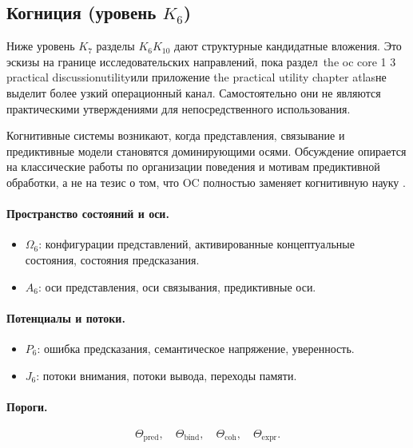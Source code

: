 \subsection{Когниция (уровень \texorpdfstring{$K_6$}{K6})}

Ниже уровень \(K_7\) разделы \(K_6\)\textendash\(K_{10}\) дают
структурные кандидатные вложения.
Это эскизы на границе исследовательских направлений, пока
раздел~the oc core 1 3 practical discussionutilityили приложение
the practical utility chapter atlasне выделит более узкий
операционный канал.
Самостоятельно они не являются практическими утверждениями для непосредственного
использования.

Когнитивные системы возникают, когда представления, связывание и
предиктивные модели становятся доминирующими осями.
Обсуждение опирается на классические работы по организации поведения и
мотивам предиктивной обработки, а не на тезис о том, что OC полностью
заменяет когнитивную науку \parencite{hebb_organization,friston_free_energy}.

\paragraph{Пространство состояний и оси.}
\begin{itemize}
  \item \(\Omega_6\): конфигурации представлений, активированные
        концептуальные состояния, состояния предсказания.
  \item \(A_6\): оси представления, оси связывания, предиктивные оси.
\end{itemize}

\paragraph{Потенциалы и потоки.}
\begin{itemize}
  \item \(P_6\): ошибка предсказания, семантическое напряжение,
        уверенность.
  \item \(J_6\): потоки внимания, потоки вывода, переходы памяти.
\end{itemize}

\paragraph{Пороги.}
\[
  \Theta_{\mathrm{pred}},\quad
  \Theta_{\mathrm{bind}},\quad
  \Theta_{\mathrm{coh}},\quad
  \Theta_{\mathrm{expr}}.
\]

